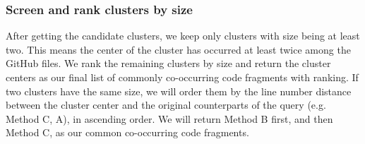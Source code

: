 \subsubsection{Screen and rank clusters by size}
After getting the candidate clusters, we keep only clusters with size being at least two. This means the center of the cluster has occurred at least twice among the GitHub files.
We rank the remaining clusters by size and return the cluster centers as our final list of commonly co-occurring code fragments with ranking. If two clusters have the same size, we will order them by the line number distance between the cluster center and the original counterparts of the query (e.g. {\ttt Method C, A}), in ascending order. We will return {\ttt Method B} first, and then {\ttt Method C}, as our common co-occurring code fragments.